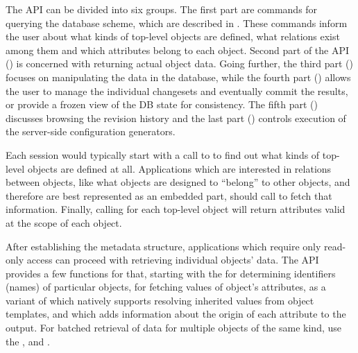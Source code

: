 \documentclass[deska]{subfiles}
\begin{document}
The API can be divided into six groups.  The first part are commands for querying the database scheme, which are
described in .  These commands inform the user about what kinds of top-level objects are
defined, what relations exist among them and which attributes belong to each object.  Second part of the API
() is concerned with returning actual object data.  Going further, the third
part () focuses on manipulating the data in the database, while the fourth
part () allows the user to manage the individual changesets and eventually commit the
results, or provide a frozen view of the DB state for consistency.  The fifth part ()
discusses browsing the revision history and the last part () controls
execution of the server-side configuration generators.

Each session would typically start with a call to  to find out what kinds of top-level objects
are defined at all.  Applications which are interested in relations between objects, like what objects are designed to
``belong'' to other objects, and therefore are best represented as an embedded part, should call
 to fetch that information.  Finally, calling  for each
top-level object will return attributes valid at the scope of each object.

After establishing the metadata structure, applications which require only read-only access can proceed with retrieving
individual objects' data.  The API provides a few functions for that, starting with the  for
determining identifiers (names) of particular objects,  for fetching values of object's
attributes,  as a variant of  which natively supports
resolving inherited values from object templates, and  which adds information
about the origin of each attribute to the output.  For batched retrieval of data for multiple objects of the same kind,
use the ,  and
.
\end{document}
